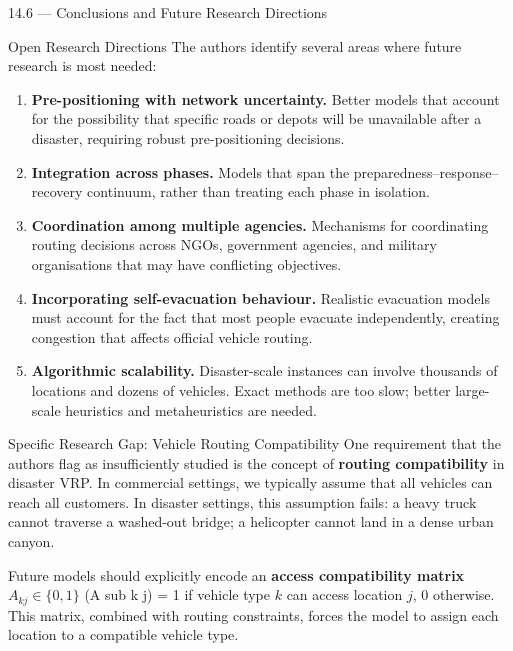 \documentclass[aspectratio=169,10pt]{beamer}
\begin{document}
\begin{frame}[allowframebreaks]{14.6 --- Conclusions and Future Research Directions}
  \begin{block}{Open Research Directions}
    The authors identify several areas where future research is
    most needed:
    \begin{enumerate}
      \item \textbf{Pre-positioning with network uncertainty.}
            Better models that account for the possibility that specific
            roads or depots will be unavailable after a disaster,
            requiring robust pre-positioning decisions.
      \item \textbf{Integration across phases.}
            Models that span the preparedness--response--recovery
            continuum, rather than treating each phase in isolation.
      \item \textbf{Coordination among multiple agencies.}
            Mechanisms for coordinating routing decisions across NGOs,
            government agencies, and military organisations that may
            have conflicting objectives.
      \item \textbf{Incorporating self-evacuation behaviour.}
            Realistic evacuation models must account for the fact that
            most people evacuate independently, creating congestion that
            affects official vehicle routing.
      \item \textbf{Algorithmic scalability.}
            Disaster-scale instances can involve thousands of locations
            and dozens of vehicles.
            Exact methods are too slow; better large-scale heuristics
            and metaheuristics are needed.
    \end{enumerate}
  \end{block}

  \framebreak

  \begin{block}{Specific Research Gap: Vehicle Routing Compatibility}
    One requirement that the authors flag as insufficiently studied
    is the concept of \textbf{routing compatibility} in disaster VRP.
    In commercial settings, we typically assume that all vehicles can
    reach all customers.
    In disaster settings, this assumption fails: a heavy truck cannot
    traverse a washed-out bridge; a helicopter cannot land in a dense
    urban canyon.

    Future models should explicitly encode an
    \textbf{access compatibility matrix} $A_{kj} \in \{0,1\}$
    (A sub k j) = 1 if vehicle type $k$ can access location $j$,
    0 otherwise.
    This matrix, combined with routing constraints, forces the model
    to assign each location to a compatible vehicle type.
  \end{block}


\end{frame}
\end{document}
